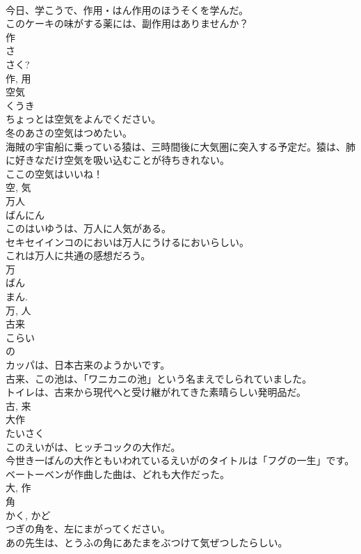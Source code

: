 \documentclass[8pt]{extreport}
\begin{document}
\begin{CJK}{UTF8}{min}
\\	今日、学こうで、作用・はん作用のほうそくを学んだ。	
\\	このケーキの味がする薬には、副作用はありませんか？	
\\	作 
\\	さ 
\\	さく? 
\\	作, 用	
\\	空気	
\\	くうき	
\\	ちょっとは空気をよんでください。	
\\	冬のあさの空気はつめたい。	
\\	海賊の宇宙船に乗っている猿は、三時間後に大気圏に突入する予定だ。猿は、肺に好きなだけ空気を吸い込むことが待ちきれない。	
\\	ここの空気はいいね！	
\\	空, 気	
\\	万人	
\\	ばんにん	
\\	このはいゆうは、万人に人気がある。	
\\	セキセイインコのにおいは万人にうけるにおいらしい。	
\\	これは万人に共通の感想だろう。	
\\	万 
\\	ばん 
\\	まん. 
\\	万, 人	
\\	古来	
\\	こらい	
\\	の 
\\	カッパは、日本古来のようかいです。	
\\	古来、この池は、「ワニカニの池」という名まえでしられていました。	
\\	トイレは、古来から現代へと受け継がれてきた素晴らしい発明品だ。	
\\	古, 来	
\\	大作	
\\	たいさく	
\\	このえいがは、ヒッチコックの大作だ。	
\\	今世き一ばんの大作ともいわれているえいがのタイトルは「フグの一生」です。	
\\	ベートーベンが作曲した曲は、どれも大作だった。	
\\	大, 作	
\\	角	
\\	かく, かど	
\\	つぎの角を、左にまがってください。	
\\	あの先生は、とうふの角にあたまをぶつけて気ぜつしたらしい。	

\end{CJK}
\end{document}
